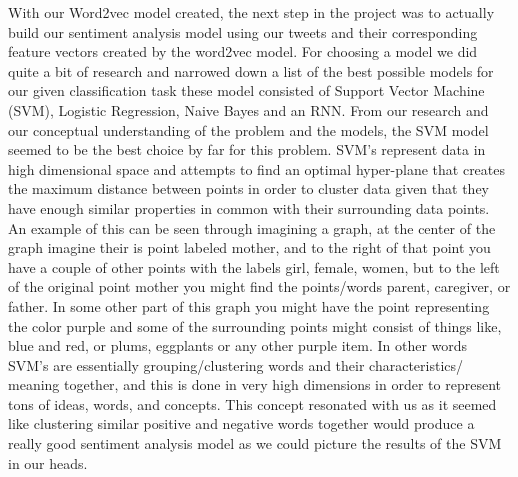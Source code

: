 \documentclass{article}
\begin{document}
With our Word2vec model created, the next step in the project was to actually build our sentiment analysis model using our tweets and their corresponding feature vectors created by the word2vec model. For choosing a model we did quite a bit of research and narrowed down a list of the best possible models for our given classification task these model consisted of Support Vector Machine (SVM), Logistic Regression, Naive Bayes and an RNN.  From our research and our conceptual understanding of the problem and the models, the SVM model seemed to be the best choice by far for this problem. SVM's represent data in high dimensional space and attempts to find an optimal hyper-plane that creates the maximum distance between points in order to cluster data given that they have enough similar properties in common with their surrounding data points. An example of this can be seen through imagining a graph, at the center of the graph imagine their is point labeled mother, and to the right of that point you have a couple of other points with the labels girl, female, women, but to the left of the original point mother you might find the points/words parent, caregiver, or father. In some other part of this graph you might have the point representing the color purple and some of the surrounding points might consist of things like, blue and red, or plums, eggplants or any other purple item. In other words SVM's are essentially grouping/clustering words and their characteristics/ meaning together, and this is done in very high dimensions in order to represent tons of ideas, words, and concepts. This concept resonated with us as it seemed like clustering similar positive and negative words together would produce a really good sentiment analysis model as we could picture the results of the SVM in our heads. 
\end{document}
